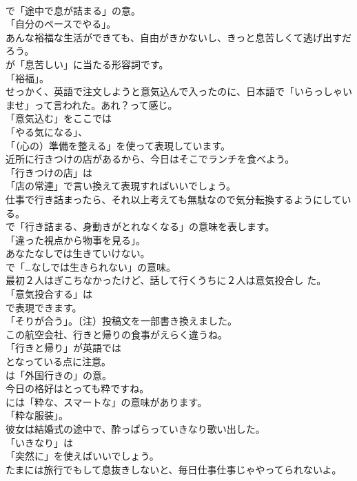 \documentclass[8pt]{extreport}
\begin{document}
\begin{CJK}{UTF8}{min}
\\	で「途中で息が詰まる」の意。
\\	「自分のペースでやる」。	
\\	あんな裕福な生活ができても、自由がきかないし、きっと息苦しくて逃げ出すだろう。 
\\	が「息苦しい」に当たる形容詞です。
\\	「裕福」。	
\\	せっかく、英語で注文しようと意気込んで入ったのに、日本語で「いらっしゃいませ」って言われた。あれ？って感じ。 
\\	「意気込む」をここでは
\\	「やる気になる」、
\\	「（心の）準備を整える」を使って表現しています。	
\\	近所に行きつけの店があるから、今日はそこでランチを食べよう。 
\\	「行きつけの店」は
\\	「店の常連」で言い換えて表現すればいいでしょう。	
\\	仕事で行き詰まったら、それ以上考えても無駄なので気分転換するようにしている。 
\\	で「行き詰まる、身動きがとれなくなる」の意味を表します。
\\	「違った視点から物事を見る」。	
\\	あなたなしでは生きていけない。 
\\	で「…なしでは生きられない」の意味。	
\\	最初２人はぎこちなかったけど、話して行くうちに２人は意気投合し た。 
\\	「意気投合する」は
\\	で表現できます。
\\	「そりが合う」。〔注）投稿文を一部書き換えました。	
\\	この航空会社、行きと帰りの食事がえらく違うね。 
\\	「行きと帰り」が英語では 
\\	となっている点に注意。
\\	は「外国行きの」の意。	
\\	今日の格好はとっても粋ですね。 
\\	には「粋な、スマートな」の意味があります。
\\	「粋な服装」。	
\\	彼女は結婚式の途中で、酔っぱらっていきなり歌い出した。 
\\	「いきなり」は
\\	「突然に」を使えばいいでしょう。	
\\	たまには旅行でもして息抜きしないと、毎日仕事仕事じゃやってられないよ。 

\end{CJK}
\end{document}
